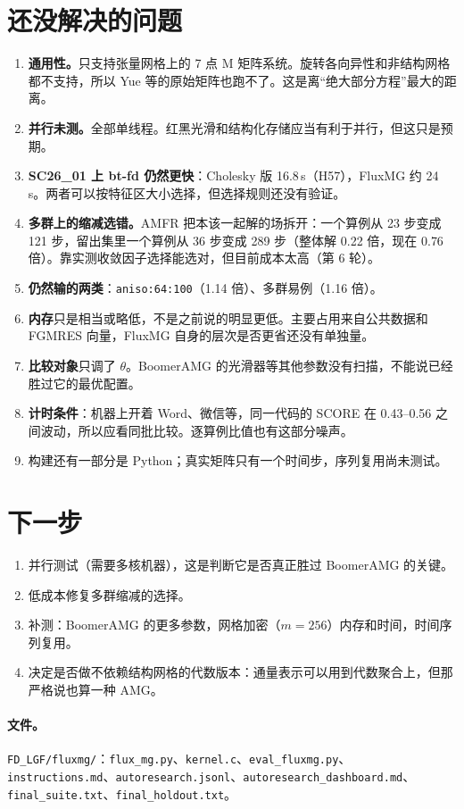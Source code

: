 \documentclass[11pt,a4paper]{ctexart}
\begin{document}
\section{还没解决的问题}
\begin{enumerate}
\item \textbf{通用性。}只支持张量网格上的 7 点 M 矩阵系统。旋转各向异性和非结构网格都不支持，所以 Yue 等的原始矩阵也跑不了。这是离“绝大部分方程”最大的距离。
\item \textbf{并行未测。}全部单线程。红黑光滑和结构化存储应当有利于并行，但这只是预期。
\item \textbf{SC26\_01 上 bt-fd 仍然更快}：Cholesky 版 16.8\,s（H57），FluxMG 约 24\,s。两者可以按特征区大小选择，但选择规则还没有验证。
\item \textbf{多群上的缩减选错。}AMFR 把本该一起解的场拆开：一个算例从 23 步变成 121 步，留出集里一个算例从 36 步变成 289 步（整体解 0.22 倍，现在 0.76 倍）。靠实测收敛因子选择能选对，但目前成本太高（第 6 轮）。
\item \textbf{仍然输的两类}：\texttt{aniso:64:100}（1.14 倍）、多群易例（1.16 倍）。
\item \textbf{内存}只是相当或略低，不是之前说的明显更低。主要占用来自公共数据和 FGMRES 向量，FluxMG 自身的层次是否更省还没有单独量。
\item \textbf{比较对象}只调了 $\theta$。BoomerAMG 的光滑器等其他参数没有扫描，不能说已经胜过它的最优配置。
\item \textbf{计时条件}：机器上开着 Word、微信等，同一代码的 SCORE 在 0.43--0.56 之间波动，所以应看同批比较。逐算例比值也有这部分噪声。
\item 构建还有一部分是 Python；真实矩阵只有一个时间步，序列复用尚未测试。
\end{enumerate}

\section{下一步}
\begin{enumerate}
\item 并行测试（需要多核机器），这是判断它是否真正胜过 BoomerAMG 的关键。
\item 低成本修复多群缩减的选择。
\item 补测：BoomerAMG 的更多参数，网格加密（$m=256$）内存和时间，时间序列复用。
\item 决定是否做不依赖结构网格的代数版本：通量表示可以用到代数聚合上，但那严格说也算一种 AMG。
\end{enumerate}

\paragraph{文件。}\sloppy\texttt{FD\_LGF/fluxmg/}：\texttt{flux\_mg.py}、\texttt{kernel.c}、\texttt{eval\_fluxmg.py}、\texttt{instructions.md}、\texttt{autoresearch.jsonl}、\texttt{autoresearch\_dashboard.md}、\texttt{final\_suite.txt}、\texttt{final\_holdout.txt}。
\end{document}
